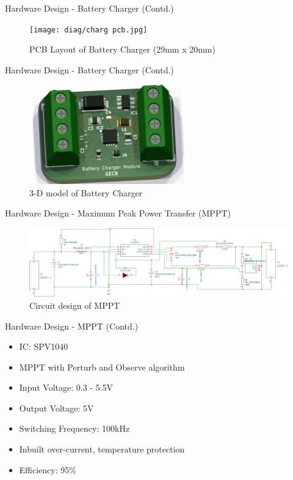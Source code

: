 \documentclass[aspectratio=169]{beamer}
\begin{document}
		\begin{frame}{Hardware Design - Battery Charger (Contd.) }
			\begin{figure}[h]
				\centering
				\texttt{[image: diag/charg pcb.jpg]}
				\caption{PCB Layout of Battery Charger (29mm x 20mm)}
				\label{fig:mesh1}
			\end{figure}
		\end{frame}
		\begin{frame}{Hardware Design - Battery Charger (Contd.) }
			\begin{figure}[h]
				\centering
				\includegraphics[width=0.6\textwidth]{diag/charg 3d.png}
				\caption{3-D model of Battery Charger}
				\label{fig:mesh1}
			\end{figure}
		\end{frame}
		
		
		
		
		\begin{frame}{Hardware Design - Maximum Peak Power Transfer (MPPT) }
			\begin{figure}[h]
				\centering
				\includegraphics[width=1\textwidth]{diag/MpptDemoBoard.pdf}
				\caption{Circuit design of MPPT}
				\label{fig:mesh1}
			\end{figure}
		\end{frame}
		
		\begin{frame}{Hardware Design - MPPT (Contd.)}
			\begin{itemize}
				\item IC: SPV1040
				\item MPPT with Perturb and Observe algorithm	
				\item Input Voltage: 0.3 - 5.5V
				\item Output Voltage: 5V
				\item Switching Frequency: 100kHz
				\item Inbuilt over-current, temperature protection
				\item Efficiency: 95\%
			\end{itemize}
		\end{frame}
		
\end{document}
